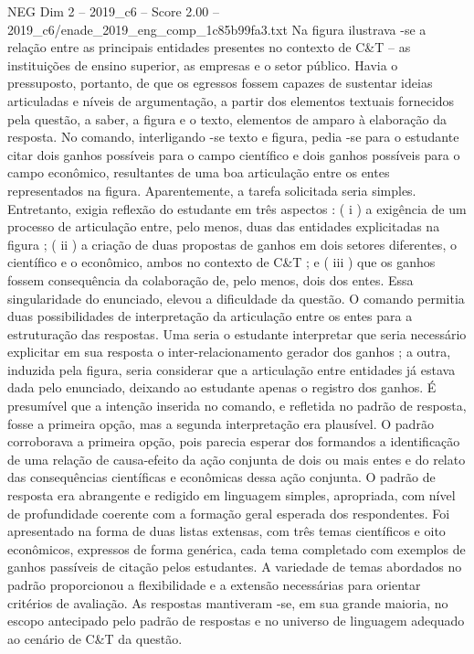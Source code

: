 \begin{textsample}{NEG Dim 2 – 2019\_c6 – Score 2.00 – 2019\_c6/enade\_2019\_eng\_comp\_1c85b99fa3.txt}
Na figura ilustrava -se a relação entre as principais entidades presentes no contexto de C\&T – as instituições de ensino superior, as empresas e o setor público.
Havia o pressuposto, portanto, de que os egressos fossem capazes de sustentar ideias articuladas e níveis de argumentação, a partir dos elementos textuais fornecidos pela questão, a saber, a figura e o texto, elementos de amparo à elaboração da resposta.
No comando, interligando -se texto e figura, pedia -se para o estudante citar dois ganhos possíveis para o campo científico e dois ganhos possíveis para o campo econômico, resultantes de uma boa articulação entre os entes representados na figura.
Aparentemente, a tarefa solicitada seria simples.
Entretanto, exigia reflexão do estudante em três aspectos : ( i ) a exigência de um processo de articulação entre, pelo menos, duas das entidades explicitadas na figura ; ( ii ) a criação de duas propostas de ganhos em dois setores diferentes, o científico e o econômico, ambos no contexto de C\&T ; e ( iii ) que os ganhos fossem consequência da colaboração de, pelo menos, dois dos entes.
Essa singularidade do enunciado, elevou a dificuldade da questão.
O comando permitia duas possibilidades de interpretação da articulação entre os entes para a estruturação das respostas.
Uma seria o estudante interpretar que seria necessário explicitar em sua resposta o inter-relacionamento gerador dos ganhos ; a outra, induzida pela figura, seria considerar que a articulação entre entidades já estava dada pelo enunciado, deixando ao estudante apenas o registro dos ganhos.
É presumível que a intenção inserida no comando, e refletida no padrão de resposta, fosse a primeira opção, mas a segunda interpretação era plausível.
O padrão corroborava a primeira opção, pois parecia esperar dos formandos a identificação de uma relação de causa-efeito da ação conjunta de dois ou mais entes e do relato das consequências científicas e econômicas dessa ação conjunta.
O padrão de resposta era abrangente e redigido em linguagem simples, apropriada, com nível de profundidade coerente com a formação geral esperada dos respondentes.
Foi apresentado na forma de duas listas extensas, com três temas científicos e oito econômicos, expressos de forma genérica, cada tema completado com exemplos de ganhos passíveis de citação pelos estudantes.
A variedade de temas abordados no padrão proporcionou a flexibilidade e a extensão necessárias para orientar critérios de avaliação.
As respostas mantiveram -se, em sua grande maioria, no escopo antecipado pelo padrão de respostas e no universo de linguagem adequado ao cenário de C\&T da questão.

\end{textsample}
